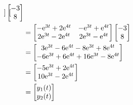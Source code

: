 \documentclass{article}
\begin{document}
\begin{itemize}
\begin{align*}
\begin{bmatrix}
        \end{bmatrix}
        \begin{bmatrix}
            -3\\
            8\\
        \end{bmatrix}\\
        &=
        \begin{bmatrix}
            -\text{e}^{3t}+2\text{e}^{4t} & -\text{e}^{3t}+\text{e}^{4t}\\
            2\text{e}^{3t}-2\text{e}^{4t} & 2\text{e}^{3t}-\text{e}^{4t}\\
        \end{bmatrix}
        \begin{bmatrix}
            -3\\
            8\\
        \end{bmatrix}\\
        &=
        \begin{bmatrix}
            3\text{e}^{3t}-6\text{e}^{4t}-8\text{e}^{3t}+8\text{e}^{4t}\\
            -6\text{e}^{3t}+6\text{e}^{4t}+16\text{e}^{3t}-8\text{e}^{4t}\\
        \end{bmatrix}\\
        &=
        \begin{bmatrix}
            -5\text{e}^{3t}+2\text{e}^{4t}\\
            10\text{e}^{3t}-2\text{e}^{4t}\\
        \end{bmatrix}\\
        &=
        \begin{bmatrix}
            y_1(t)\\
            y_2(t)\\
        \end{bmatrix}
    \end{align*}
\end{itemize}
\end{document}

